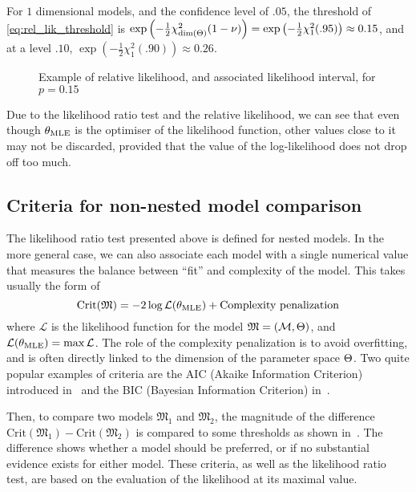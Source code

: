 \documentclass[../../Main_ManuscritThese.tex]{subfiles}
\newcommand\imgpath{/home/victor/acadwriting/Manuscrit/Text/Chapter2/img/}
\begin{document}
For $1$ dimensional models, and the confidence level of $.05$, the threshold of \cref{eq:rel_lik_threshold} is $\exp\left(-\frac{1}{2}\chi^2_{\mathrm{dim}(\Theta)}(1-\nu)\right) = \exp\left(-\frac{1}{2}\chi^2_{1}(.95)\right) \approx 0.15$, and at a level $.10$, $\exp\left(-\frac{1}{2}\chi^2_{1}(.90)\right) \approx 0.26$.

\begin{figure}[ht]
  \centering 
  
  \caption{\label{fig:relative_likelihood} Example of relative likelihood, and associated likelihood interval, for $p=0.15$}
\end{figure}

Due to the likelihood ratio test and the relative likelihood, we can see that even though ${\theta}_{\mathrm{MLE}}$ is the optimiser of the likelihood function, other values close to it may not be discarded, provided that the value of the log-likelihood does not drop off too much.

\subsection{Criteria for non-nested model comparison}
\label{sec:criteria_AIC}
The likelihood ratio test presented above is defined for nested models. In the more general case, we can also associate each model with a single numerical value that measures the balance between ``fit'' and complexity of the model. This takes usually the form of
\begin{equation}
  \mathrm{Crit}(\mathfrak{M})=-2 \log \mathcal{L} ({\theta}_{\mathrm{MLE}}) + \text{Complexity penalization}
\end{equation}
where $\mathcal{L}$ is the likelihood function for the model $\mathfrak{M} = (\mathcal{M},\Theta)$, and $\mathcal{L}({\theta}_{\mathrm{MLE}}) = \max \mathcal{L}$. The role of the complexity penalization is to avoid overfitting, and is often directly linked to the dimension of the parameter space $\Theta$.
Two quite popular examples of criteria are the AIC (Akaike Information Criterion) introduced in~\cite{akaike_new_1974} and the BIC (Bayesian Information Criterion) in~\cite{schwarz_estimating_1978}.

Then, to compare two models $\mathfrak{M}_1$ and $\mathfrak{M}_2$, the magnitude of the difference $\mathrm{Crit}(\mathfrak{M}_1) - \mathrm{Crit}(\mathfrak{M}_2)$ is compared to some thresholds as shown in~\cite{burnham_multimodel_2004}.
The difference shows whether a model should be preferred, or if no substantial evidence exists for either model.
These criteria, as well as the likelihood ratio test, are based on the evaluation of the likelihood at its maximal value.
\end{document}
